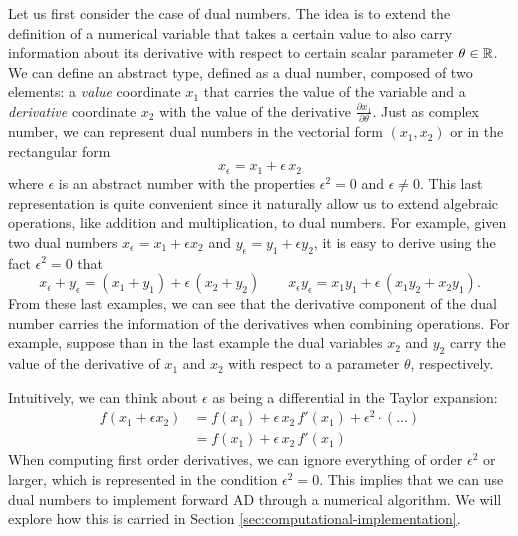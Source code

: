 Let us first consider the case of dual numbers.
The idea is to extend the definition of a numerical variable that takes a certain value to also carry information about its derivative with respect to certain scalar parameter $\theta \in \operatorname{\mathbb{R}}$. 
We can define an abstract type, defined as a dual number, composed of two elements: a \textit{value} coordinate $x_1$ that carries the value of the variable and a \textit{derivative} coordinate $x_2$ with the value of the derivative $\frac{\partial x_1}{\partial \theta}$. 
Just as complex number, we can represent dual numbers in the vectorial form $(x_1, x_2)$ or in the rectangular form 
\begin{equation}
 x_\epsilon = x_1 + \epsilon \, x_2
\end{equation}
where $\epsilon$ is an abstract number with the properties $\epsilon^2 = 0$ and $\epsilon \neq 0$.
This last representation is quite convenient since it naturally allow us to extend algebraic operations, like addition and multiplication, to dual numbers. 
For example, given two dual numbers $x_\epsilon = x_1 + \epsilon x_2$ and $y_\epsilon = y_1 + \epsilon y_2$, it is easy to derive using the fact $\epsilon^2=0$ that
\begin{equation}
 x_\epsilon + y_\epsilon = (x_1 + y_1) + \epsilon \, (x_2 + y_2)
 \qquad
 x_\epsilon y_\epsilon = x_1 y_1 + \epsilon \, (x_1 y_2 + x_2 y_1) .
\end{equation}
From these last examples, we can see that the derivative component of the dual number carries the information of the derivatives when combining operations.
For example, suppose than in the last example the dual variables $x_2$ and $y_2$ carry the value of the derivative of $x_1$ and $x_2$ with respect to a parameter $\theta$, respectively. 

Intuitively, we can think about $\epsilon$ as being a differential in the Taylor expansion:
\begin{align}
    f(x_1 + \epsilon x_2)
    &= 
    f(x_1)
    + 
    \epsilon \, x_2 \,  f'(x_1)
    + 
    \epsilon^2 \cdot ( \ldots ) \nonumber \\
    &= 
    f(x_1)
    + 
    \epsilon \, x_2 \,  f'(x_1)
    \label{eq:dual-number-function}
\end{align}
When computing first order derivatives, we can ignore everything of order $\epsilon^2$ or larger, which is represented in the condition $\epsilon^2 = 0$.
This implies that we can use dual numbers to implement forward AD through a numerical algorithm. 
We will explore how this is carried in Section \ref{sec:computational-implementation}.

